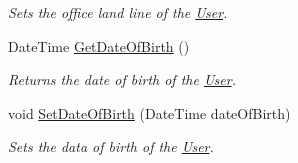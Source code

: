 \begin{DoxyCompactItemize}
\begin{DoxyCompactList}\small\item\em Sets the office land line of the \hyperlink{classcom_1_1shephertz_1_1app42_1_1paas_1_1sdk_1_1csharp_1_1user_1_1_user}{User}. \end{DoxyCompactList}\item 
Date\+Time \hyperlink{classcom_1_1shephertz_1_1app42_1_1paas_1_1sdk_1_1csharp_1_1user_1_1_user_1_1_profile_ad659110af237afdad8bfff98d7492648}{Get\+Date\+Of\+Birth} ()
\begin{DoxyCompactList}\small\item\em Returns the date of birth of the \hyperlink{classcom_1_1shephertz_1_1app42_1_1paas_1_1sdk_1_1csharp_1_1user_1_1_user}{User}. \end{DoxyCompactList}\item 
void \hyperlink{classcom_1_1shephertz_1_1app42_1_1paas_1_1sdk_1_1csharp_1_1user_1_1_user_1_1_profile_a3395a27dcd9a098b296424f067e00d8c}{Set\+Date\+Of\+Birth} (Date\+Time date\+Of\+Birth)
\begin{DoxyCompactList}\small\item\em Sets the data of birth of the \hyperlink{classcom_1_1shephertz_1_1app42_1_1paas_1_1sdk_1_1csharp_1_1user_1_1_user}{User}. \end{DoxyCompactList}\end{DoxyCompactItemize}
